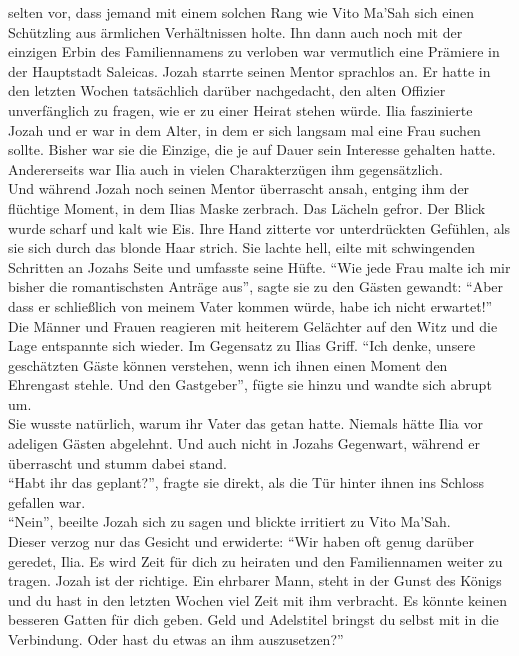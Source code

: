 selten vor, dass jemand mit einem solchen Rang wie Vito Ma'Sah sich einen Schützling aus ärmlichen 
Verhältnissen holte. Ihn dann auch noch mit der einzigen Erbin des Familiennamens zu verloben war 
vermutlich eine Prämiere in der Hauptstadt Saleicas. Jozah starrte seinen Mentor sprachlos an. Er 
hatte in den letzten Wochen tatsächlich darüber nachgedacht, den alten Offizier unverfänglich zu 
fragen, wie er zu einer Heirat stehen würde. Ilia faszinierte Jozah und er war in dem Alter, in dem 
er sich langsam mal eine Frau suchen sollte. Bisher war sie die Einzige, die je auf Dauer sein 
Interesse gehalten hatte. Andererseits war Ilia auch in vielen Charakterzügen ihm gegensätzlich.\\
Und während Jozah noch seinen Mentor überrascht ansah, entging ihm der flüchtige Moment, in dem 
Ilias Maske zerbrach. Das Lächeln gefror. Der Blick wurde scharf und kalt wie Eis. Ihre Hand 
zitterte vor unterdrückten Gefühlen, als sie sich durch das blonde Haar strich. Sie lachte hell, 
eilte mit schwingenden Schritten an Jozahs Seite und umfasste seine Hüfte. ``Wie jede Frau malte 
ich mir bisher die romantischsten Anträge aus'', sagte sie zu den Gästen gewandt: ``Aber dass er 
schließlich von meinem Vater kommen würde, habe ich nicht erwartet!''\\
Die Männer und Frauen reagieren mit heiterem Gelächter auf den Witz und die Lage entspannte sich 
wieder. Im Gegensatz zu Ilias Griff. ``Ich denke, unsere geschätzten Gäste können verstehen, wenn 
ich ihnen einen Moment den Ehrengast stehle. Und den Gastgeber'', fügte sie hinzu und wandte sich 
abrupt um.\\
Sie wusste natürlich, warum ihr Vater das getan hatte. Niemals hätte Ilia vor adeligen Gästen 
abgelehnt. Und auch nicht in Jozahs Gegenwart, während er überrascht und stumm dabei stand.\\
``Habt ihr das geplant?'', fragte sie direkt, als die Tür hinter ihnen ins Schloss gefallen war.\\
``Nein'', beeilte Jozah sich zu sagen und blickte irritiert zu Vito Ma'Sah.\\
Dieser verzog nur das Gesicht und erwiderte: ``Wir haben oft genug darüber geredet, Ilia. Es wird 
Zeit für dich zu heiraten und den Familiennamen weiter zu tragen. Jozah ist der richtige. Ein 
ehrbarer Mann, steht in der Gunst des Königs und du hast in den letzten Wochen viel Zeit mit ihm 
verbracht. Es könnte keinen besseren Gatten für dich geben. Geld und Adelstitel bringst du selbst 
mit in die Verbindung. Oder hast du etwas an ihm auszusetzen?''\\
